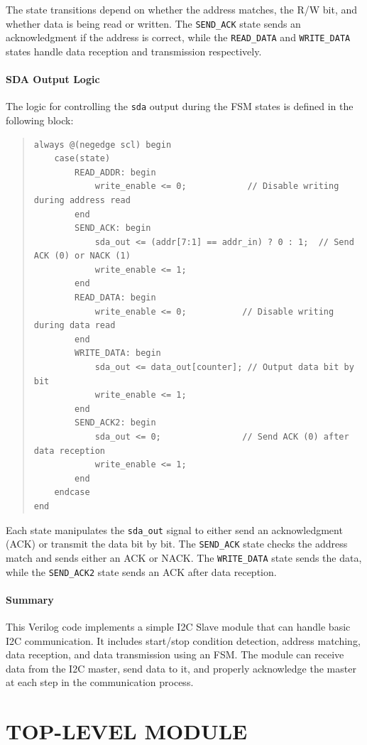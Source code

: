 \documentclass[a4paper,12pt]{report}
\begin{document}
The state transitions depend on whether the address matches, the R/W bit, and whether data is being read or written. The \texttt{SEND\_ACK} state sends an acknowledgment if the address is correct, while the \texttt{READ\_DATA} and \texttt{WRITE\_DATA} states handle data reception and transmission respectively.

\paragraph{SDA Output Logic}
The logic for controlling the \texttt{sda} output during the FSM states is defined in the following block:

\begin{quote}
\begin{verbatim}
always @(negedge scl) begin
    case(state)
        READ_ADDR: begin
            write_enable <= 0;            // Disable writing during address read
        end
        SEND_ACK: begin
            sda_out <= (addr[7:1] == addr_in) ? 0 : 1;  // Send ACK (0) or NACK (1)
            write_enable <= 1;    
        end
        READ_DATA: begin
            write_enable <= 0;           // Disable writing during data read
        end
        WRITE_DATA: begin
            sda_out <= data_out[counter]; // Output data bit by bit
            write_enable <= 1;
        end
        SEND_ACK2: begin
            sda_out <= 0;                // Send ACK (0) after data reception
            write_enable <= 1;
        end
    endcase
end
\end{verbatim}
\end{quote}

Each state manipulates the \texttt{sda\_out} signal to either send an acknowledgment (ACK) or transmit the data bit by bit. The \texttt{SEND\_ACK} state checks the address match and sends either an ACK or NACK. The \texttt{WRITE\_DATA} state sends the data, while the \texttt{SEND\_ACK2} state sends an ACK after data reception.

\paragraph{Summary}
This Verilog code implements a simple I2C Slave module that can handle basic I2C communication. It includes start/stop condition detection, address matching, data reception, and data transmission using an FSM. The module can receive data from the I2C master, send data to it, and properly acknowledge the master at each step in the communication process.
\newpage
\section{TOP-LEVEL MODULE}
\end{document}
